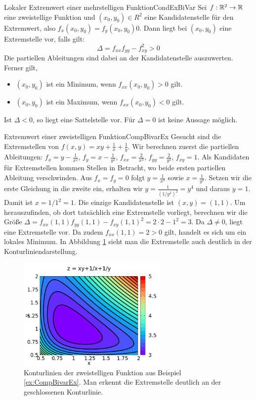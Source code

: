 \begin{statement}{Lokaler Extremwert einer mehrstelligen Funktion}{CondExBiVar}
    Sei $f: \mathbb{R}^2 \to \mathbb{R}$ eine zweistellige Funktion und $(x_0,y_0)\in R^2$ eine Kandidatenstelle für den Extremwert, also $f_x(x_0,y_0) = f_y(x_0,y_0) 0$. Dann liegt bei $(x_0,y_0)$ eine Extremstelle vor, falls gilt:
    $$
        \Delta = f_{xx} f_{yy} - f_{xy}^2 > 0
    $$
    Die partiellen Ableitungen sind dabei an der Kandidatenstelle auszuwerten. Ferner gilt,
    \begin{itemize}
        \item $(x_0,y_0)$ ist ein Minimum, wenn $f_{xx}(x_0,y_0) > 0$ gilt.
        \item $(x_0,y_0)$ ist ein Maximum, wenn $f_{xx}(x_0,y_0) < 0$ gilt.
    \end{itemize}
    Ist $\Delta < 0$, so liegt eine Sattelstelle vor. Für $\Delta = 0$ ist keine Aussage möglich.
\end{statement}

\begin{example}{Extremwert einer zweistelligen Funktion}{CompBivarEx}
    Gesucht sind die Extremstellen von $f(x,y) = xy + \frac{1}{x} + \frac{1}{y}$. Wir berechnen zuerst die partiellen Ableitungen: $f_x = y-\frac{1}{x^2}$, $f_y = x-\frac{1}{y^2}$, $f_{xx} = \frac{2}{x^3}$, $f_{yy} = \frac{2}{y^3}$, $f_{xy} = 1$. Als Kandidaten für Extremstellen kommen Stellen in Betracht, wo beide ersten partiellen Ableitung verschwinden. Aus $f_x = f_y = 0$ folgt $y=\frac{1}{x^2}$ sowie $x=\frac{1}{y^2}$. Setzen wir die erste Gleichung in die zweite ein, erhalten wir $y=\frac{1}{\left(1/y^2\right)^2} = y^4$ und daraus $y=1$. Damit ist $x=1/1^2 = 1$. Die einzige Kandidatenstelle ist $(x,y) =(1,1)$. Um herauszufinden, ob dort tatsächlich eine Extremstelle vorliegt, berechnen wir die Größe $\Delta = f_{xx}(1,1)f_{yy}(1,1) - f_{xy}(1,1)^2 = 2\cdot2 - 1^2 = 3$. Da $\Delta \ne 0$, liegt eine Extremstelle vor. Da zudem $f_{xx}(1,1) = 2 > 0$ gilt, handelt es sich um ein lokales Minimum. In Abbildung \ref{fig:ExCompBivarEx} sieht man die Extremstelle auch deutlich in der Konturliniendarstellung.
\end{example}

\begin{figure}
    \centering
    \includegraphics[width=0.65\textwidth]{./gnuplot/contour-field-extrem-values}
    \caption[Extremwertbestimmung mittels Konturlinien]{Konturlinien der zweistelligen Funktion aus Beispiel \ref{ex:CompBivarEx}. Man erkennt die Extremstelle deutlich an der geschlossenen Konturlinie.}
    \label{fig:ExCompBivarEx}
\end{figure}
